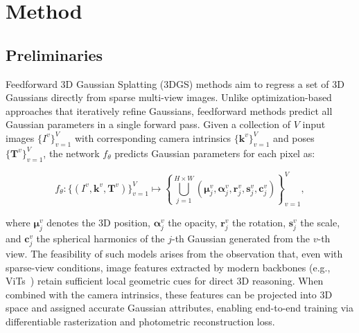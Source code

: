 \section{Method}


\subsection{Preliminaries}

Feedforward 3D Gaussian Splatting (3DGS) methods aim to regress a set of 3D Gaussians directly from sparse multi-view images.
Unlike optimization-based approaches that iteratively refine Gaussians, feedforward methods predict all Gaussian parameters in a single forward pass.
Given a collection of $V$ input images $\{I^v\}_{v=1}^{V}$ with corresponding camera intrinsics $\{\mathbf{k}^v\}_{v=1}^{V}$ and poses $\{\mathbf{T}^v\}_{v=1}^{V}$,
the network $f_\theta$ predicts Gaussian parameters for each pixel as:

\begin{equation}
f_\theta : \{(I^v, \mathbf{k}^v, \mathbf{T}^v)\}_{v=1}^{V} \mapsto \left\{ \bigcup_{j=1}^{H \times W} \left(\boldsymbol{\mu}_j^v, \boldsymbol{\alpha}_j^v, \mathbf{r}_j^v, \mathbf{s}_j^v, \mathbf{c}_j^v\right) \right\}_{v=1}^{V},
\end{equation}

where $\boldsymbol{\mu}_j^v$ denotes the 3D position, $\boldsymbol{\alpha}_j^v$ the opacity, $\mathbf{r}_j^v$ the rotation, $\mathbf{s}_j^v$ the scale, and $\mathbf{c}_j^v$ the spherical harmonics of the $j$-th Gaussian generated from the $v$-th view. 
The feasibility of such models arises from the observation that, even with sparse-view conditions, image features extracted by modern backbones (e.g., ViTs~\cite{ranftl2021vision,zhang2022dino,wang2024dust3r}) retain sufficient local geometric cues for direct 3D reasoning. When combined with the camera intrinsics, these features can be projected into 3D space and assigned accurate Gaussian attributes, enabling end-to-end training via differentiable rasterization and photometric reconstruction loss. 

